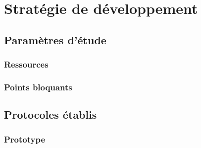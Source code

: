 \chapter{Stratégie de développement}

\section{Paramètres d'étude}

\subsection{Ressources}
\subsection{Points bloquants}

\section{Protocoles établis}

\subsection{Prototype}